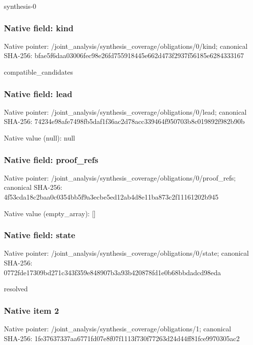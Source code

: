 \documentclass[10pt,a4paper]{article}
\begin{document}
\begingroup\raggedright\sloppy synthesis-0\par\endgroup

\subsubsection{Native field: kind}
Native pointer: /joint\_\allowbreak{}analysis/synthesis\_\allowbreak{}coverage/obligations/0/kind; canonical SHA-256: bfae5f6daa03006fec98e26fd755918445e662d473f2937f56185e6284333167

\begingroup\raggedright\sloppy compatible\_\allowbreak{}candidates\par\endgroup

\subsubsection{Native field: lead}
Native pointer: /joint\_\allowbreak{}analysis/synthesis\_\allowbreak{}coverage/obligations/0/lead; canonical SHA-256: 74234e98afe7498fb5daf1f36ac2d78acc339464f950703b8c019892f982b90b

Native value (null): null

\subsubsection{Native field: proof\_\allowbreak{}refs}
Native pointer: /joint\_\allowbreak{}analysis/synthesis\_\allowbreak{}coverage/obligations/0/proof\_\allowbreak{}refs; canonical SHA-256: 4f53cda18c2baa0c0354bb5f9a3ecbe5ed12ab4d8e11ba873c2f11161202b945

Native value (empty\_\allowbreak{}array): []

\subsubsection{Native field: state}
Native pointer: /joint\_\allowbreak{}analysis/synthesis\_\allowbreak{}coverage/obligations/0/state; canonical SHA-256: 0772fde17309bd271c343f359e848907b3a93b420878fd1e0b68bbdadcd98eda

\begingroup\raggedright\sloppy resolved\par\endgroup

\subsubsection{Native item 2}
Native pointer: /joint\_\allowbreak{}analysis/synthesis\_\allowbreak{}coverage/obligations/1; canonical SHA-256: 1fe37637337aa6771fd07e8f07f1113f730f77263d24d44ff81fce9970305ac2
\end{document}
